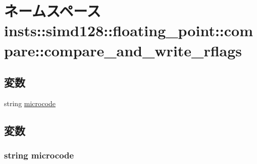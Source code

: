 \hypertarget{namespaceinsts_1_1simd128_1_1floating__point_1_1compare_1_1compare__and__write__rflags}{
\section{ネームスペース insts::simd128::floating\_\-point::compare::compare\_\-and\_\-write\_\-rflags}
\label{namespaceinsts_1_1simd128_1_1floating__point_1_1compare_1_1compare__and__write__rflags}
}
\subsection*{変数}
\begin{DoxyCompactItemize}
\item 
string \hyperlink{namespaceinsts_1_1simd128_1_1floating__point_1_1compare_1_1compare__and__write__rflags_a770f11a173e99389a8802f0107ed8f52}{microcode}
\end{DoxyCompactItemize}


\subsection{変数}
\hypertarget{namespaceinsts_1_1simd128_1_1floating__point_1_1compare_1_1compare__and__write__rflags_a770f11a173e99389a8802f0107ed8f52}{
\subsubsection[{microcode}]{\setlength{\rightskip}{0pt plus 5cm}string {\bf microcode}}}
\label{namespaceinsts_1_1simd128_1_1floating__point_1_1compare_1_1compare__and__write__rflags_a770f11a173e99389a8802f0107ed8f52}
